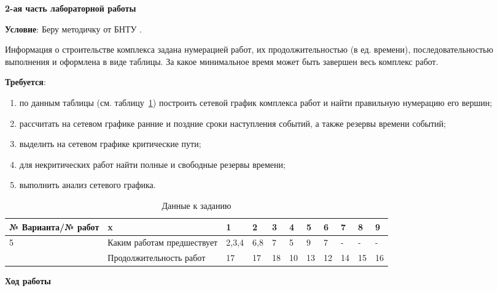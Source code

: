 \newpage

\begin{center}
  \textbf{2-ая часть лабораторной работы}
\end{center}

\textbf{Условие}: Беру методичку от БНТУ \cite{MethodBntu}.

Информация о строительстве комплекса задана нумерацией работ,
их продолжительностью (в ед. времени),
последовательностью выполнения и оформлена в виде таблицы.
За какое минимальное время может быть завершен весь комплекс работ.

\textbf{Требуется}:
\begin{enumerate}
  \item[1)] по данным таблицы (см. таблицу~\ref{tab:part2_option5}) построить сетевой график комплекса работ и найти правильную нумерацию его вершин;
  \item[2)] рассчитать на сетевом графике ранние и поздние сроки наступления событий, а также резервы времени событий;
  \item[3)] выделить на сетевом графике критические пути;
  \item[4)] для некритических работ найти полные и свободные резервы времени;
  \item[5)] выполнить анализ сетевого графика.
\end{enumerate}

\begin{table}[h!]
  \centering

  \scriptsize

  \caption{Данные к заданию}
  \label{tab:part2_option5}

  \begin{tabular}{|l|l|l|l|l|l|l|l|l|l|l|} 
    \hline
    № Варианта/№ работ &x&1&2&3&4&5&6&7&8&9\\  \hline
    \multirow{2}{*}{5}&Каким работам предшествует&2,3,4&6,8&7&5&9&7&-&-&-\\ %
    &Продолжительность работ&17&17&18&10&13&12&14&15&16\\  \hline
  \end{tabular}
\end{table}

\begin{center}
  \textbf{Ход работы}
\end{center}



